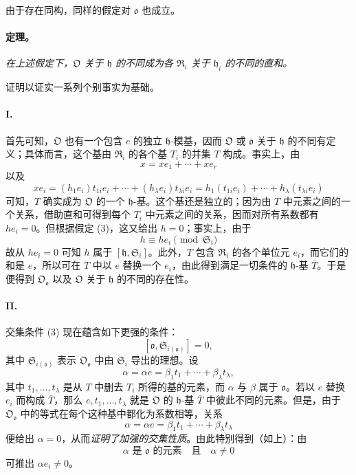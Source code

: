 由于存在同构，同样的假定对 $\mathfrak o$ 也成立。

\paragraph{定理。}
\emph{在上述假定下，$\mathfrak O$ 关于 $\mathfrak h$ 的不同成为各 $\mathfrak R_i$ 关于 $\mathfrak h_i$ 的不同的直和。}

证明以证实一系列个别事实为基础。

\paragraph{I.}
首先可知，$\mathfrak O$ 也有一个包含 $e$ 的独立 $\mathfrak h$-模基，因而 $\mathfrak O$ 或 $\mathfrak o$ 关于 $\mathfrak h$ 的不同有定义；具体而言，这个基由 $\mathfrak R_i$ 的各个基 $T_i$ 的并集 $T$ 构成。事实上，由
\[
x=xe_1+\cdots+xe_r
\]
以及
\[
xe_i=(h_1e_i)t_{1i}e_i+\cdots+(h_\lambda e_i)t_{\lambda i}e_i
=h_1(t_{1i}e_i)+\cdots+h_\lambda(t_{\lambda i}e_i)
\]
可知，$T$ 确实成为 $\mathfrak O$ 的一个 $\mathfrak h$-基。这个基还是独立的；因为由 $T$ 中元素之间的一个关系，借助直和可得到每个 $T_i$ 中元素之间的关系，因而对所有系数都有 $h e_i=0$。但根据假定 (3)，这又给出 $h=0$；事实上，由于
\[
h\equiv h e_i\pmod{\mathfrak S_i}
\]
故从 $h e_i=0$ 可知 $h$ 属于 $[\mathfrak h,\mathfrak S_i]$。此外，$T$ 包含 $\mathfrak R_i$ 的各个单位元 $e_i$，而它们的和是 $e$，所以可在 $T$ 中以 $e$ 替换一个 $e_i$，由此得到满足一切条件的 $\mathfrak h$-基 $\overline T$。于是便得到 $\mathfrak O_{\mathfrak o}$ 以及 $\mathfrak O$ 关于 $\mathfrak h$ 的不同的存在性。

\paragraph{II.}
交集条件 (3) 现在蕴含如下更强的条件：
\[
[\mathfrak o,\mathfrak S_{i(\mathfrak o)}]=0,
\]
其中 $\mathfrak S_{i(\mathfrak o)}$ 表示 $\mathfrak O_{\mathfrak o}$ 中由 $\mathfrak S_i$ 导出的理想。设
\[
\alpha=\alpha e=\beta_1t_1+\cdots+\beta_\lambda t_\lambda,
\]
其中 $t_1,\ldots,t_\lambda$ 是从 $T$ 中删去 $T_i$ 所得的基的元素，而 $\alpha$ 与 $\beta$ 属于 $\mathfrak o$。若以 $e$ 替换 $e_i$ 而构成 $\overline T$，那么 $e,t_1,\ldots,t_\lambda$ 就是 $\mathfrak O$ 的 $\mathfrak h$-基 $\overline T$ 中彼此不同的元素。但是，由于 $\mathfrak O_{\mathfrak o}$ 中的等式在每个这种基中都化为系数相等，关系
\[
\alpha=\alpha e=\beta_1t_1+\cdots+\beta_\lambda t_\lambda
\]
便给出 $\alpha=0$，从而\emph{证明了加强的交集性质}。由此特别得到（如上）：由
\[
\alpha\text{ 是 }\mathfrak o\text{ 的元素}\quad\text{且}\quad\alpha\ne0
\]
可推出 $\alpha e_i\ne0$。

